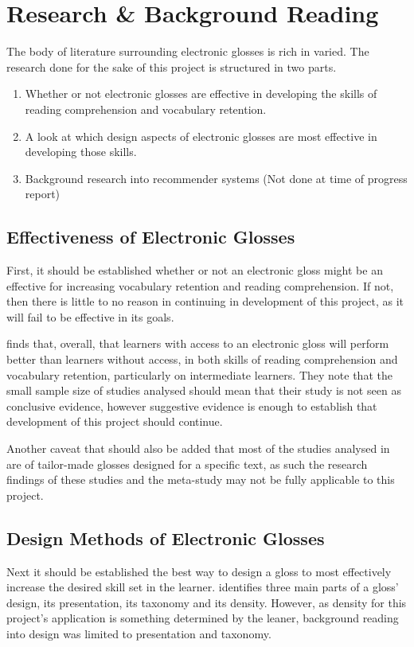 \chapter{Research \& Background Reading}
The body of literature surrounding electronic glosses is rich in varied. The research done for the sake of this project is structured in two parts.
\begin{enumerate}
	\item Whether or not electronic glosses are effective in developing the skills of reading comprehension and vocabulary retention.
	\item A look at which design aspects of electronic glosses are most effective in developing those skills.
	\item Background research into recommender systems (Not done at time of progress report) 
\end{enumerate}

\section{Effectiveness of Electronic Glosses}
First, it should be established whether or not an electronic gloss might be an effective for increasing vocabulary retention and reading comprehension. If not, then there is little to no reason in continuing in development of this project, as it will fail to be effective in its goals. 

\textcite{abraham2008} finds that, overall, that learners with access to an electronic gloss will perform better than learners without access, in both skills of reading comprehension and vocabulary retention, particularly on intermediate learners. They note that the small sample size of studies analysed should mean that their study is not seen as conclusive evidence, however suggestive evidence is enough to establish that development of this project should continue.

Another caveat that should also be added that most of the studies analysed in \textcite{abraham2008} are of tailor-made glosses designed for a specific text, as such the research findings of these studies and the meta-study may not be fully applicable to this project.


\section{Design Methods of Electronic Glosses}

Next it should be established the best way to design a gloss to most effectively increase the desired skill set in the learner. \textcite{roby1999} identifies three main parts of a gloss' design, its presentation, its taxonomy and its density. However, as density for this project's application is something determined by the leaner, background reading into design was limited to presentation and taxonomy. 

